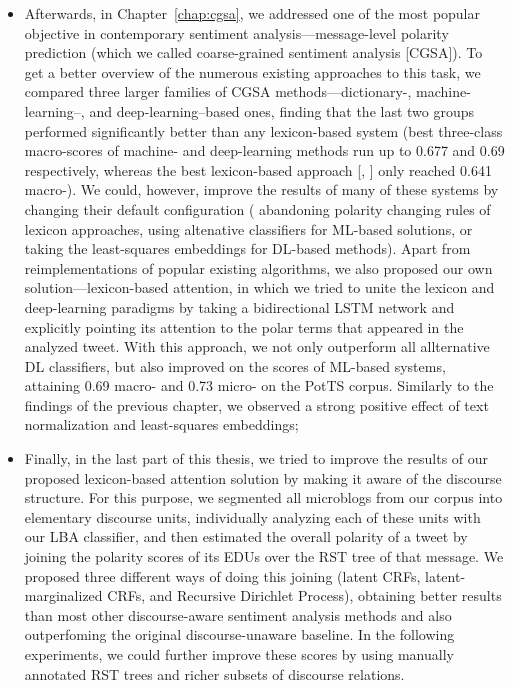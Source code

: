 \begin{itemize}
\item Afterwards, in Chapter~\ref{chap:cgsa}, we addressed one of the
  most popular objective in contemporary sentiment
  analysis---message-level polarity prediction (which we called
  coarse-grained sentiment analysis [CGSA]).  To get a better overview
  of the numerous existing approaches to this task, we compared three
  larger families of CGSA methods---dictionary-, machine-learning--,
  and deep-learning--based ones, finding that the last two groups
  performed significantly better than any lexicon-based system (best
  three-class macro-scores of machine- and deep-learning methods run
  up to 0.677 and 0.69 respectively, whereas the best lexicon-based
  approach [\citeauthor{Hu:04}, \citeyear{Hu:04}] only reached 0.641
  macro-\F{}).  We could, however, improve the results of many of
  these systems by changing their default configuration (\eg{}
  abandoning polarity changing rules of lexicon approaches, using
  altenative classifiers for ML-based solutions, or taking the
  least-squares embeddings for DL-based methods).  Apart from
  reimplementations of popular existing algorithms, we also proposed
  our own solution---lexicon-based attention, in which we tried to
  unite the lexicon and deep-learning paradigms by taking a
  bidirectional LSTM network and explicitly pointing its attention to
  the polar terms that appeared in the analyzed tweet. With this
  approach, we not only outperform all allternative DL classifiers,
  but also improved on the scores of ML-based systems, attaining 0.69
  macro-\F{} and 0.73 micro-\F{} on the PotTS corpus.  Similarly to
  the findings of the previous chapter, we observed a strong positive
  effect of text normalization and least-squares embeddings;

\item Finally, in the last part of this thesis, we tried to improve
  the results of our proposed lexicon-based attention solution by
  making it aware of the discourse structure.  For this purpose, we
  segmented all microblogs from our corpus into elementary discourse
  units, individually analyzing each of these units with our LBA
  classifier, and then estimated the overall polarity of a tweet by
  joining the polarity scores of its EDUs over the RST tree of that
  message.  We proposed three different ways of doing this joining
  (latent CRFs, latent-marginalized CRFs, and Recursive Dirichlet
  Process), obtaining better results than most other discourse-aware
  sentiment analysis methods and also outperfoming the original
  discourse-unaware baseline.  In the following experiments, we could
  further improve these scores by using manually annotated RST trees
  and richer subsets of discourse relations.
\end{itemize}

